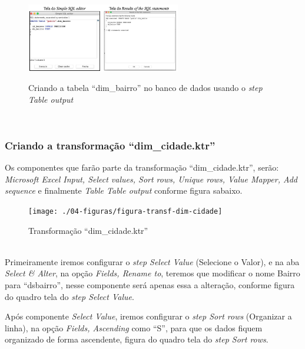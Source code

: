 \begin{figure}[H]
	\vspace*{0,2cm}
    \centering
    \caption{Criando a tabela ``dim\_bairro'' no banco de dados usando o \textit{step Table output}}
    \includegraphics[width=0.6\textwidth]{./04-figuras/figura-tb-dim-bairro}
    \label{fig:ilustfigtbdimbairros}
\end{figure}
\vspace*{-0,9cm}
{\raggedright {}} \\

\subsubsection{Criando a transforma\c{c}\~{a}o ``dim\_cidade.ktr''}

Os componentes que far\~{a}o parte da transforma\c{c}\~{a}o ``dim\_cidade.ktr'', ser\~{a}o: \textit{Microsoft Excel Input, Select values, Sort rows, Unique rows, Value Mapper, Add sequence} e finalmente \textit{Table Table output} conforme figura sabaixo. 

\begin{figure}[H]
	\vspace*{0,2cm}
    \centering
    \caption{Transforma\c{c}\~{a}o ``dim\_cidade.ktr''}
    \texttt{[image: ./04-figuras/figura-transf-dim-cidade]}
    \label{fig:ilustfigtransfdimcidade}
\end{figure}
\vspace*{-0,9cm}
{\raggedright {}} \\

Primeiramente iremos configurar o \textit{step Select Value} (Selecione o Valor), e na aba \textit{Select & Alter}, na op\c{c}\~{a}o \textit{Fields, Rename to}, teremos que modificar o nome Bairro para ``ds\-bairro'', nesse componente ser\'{a} apenas essa a altera\c{c}\~{a}o, conforme figura do quadro tela do \textit{step Select Value}.

Ap\'os  componente \textit{Select Value}, iremos configurar o \textit{step Sort rows} (Organizar a linha), na op\c{c}\~{a}o \textit{Fields, Ascending} como ``S'', para que os dados fiquem organizado de forma ascendente, figura do quadro tela do \textit{step Sort rows}.


